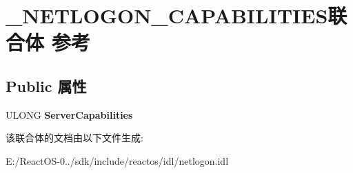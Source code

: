 \hypertarget{union___n_e_t_l_o_g_o_n___c_a_p_a_b_i_l_i_t_i_e_s}{}\section{\+\_\+\+N\+E\+T\+L\+O\+G\+O\+N\+\_\+\+C\+A\+P\+A\+B\+I\+L\+I\+T\+I\+E\+S联合体 参考}
\label{union___n_e_t_l_o_g_o_n___c_a_p_a_b_i_l_i_t_i_e_s}
\subsection*{Public 属性}
\begin{DoxyCompactItemize}
\item 
\mbox{\label{union___n_e_t_l_o_g_o_n___c_a_p_a_b_i_l_i_t_i_e_s_ac27b80e1636c531b272788d879c52cf4}} 
U\+L\+O\+NG {\bfseries Server\+Capabilities}
\end{DoxyCompactItemize}


该联合体的文档由以下文件生成\+:\begin{DoxyCompactItemize}
\item 
E\+:/\+React\+O\+S-\/0../sdk/include/reactos/idl/netlogon.\+idl\end{DoxyCompactItemize}
